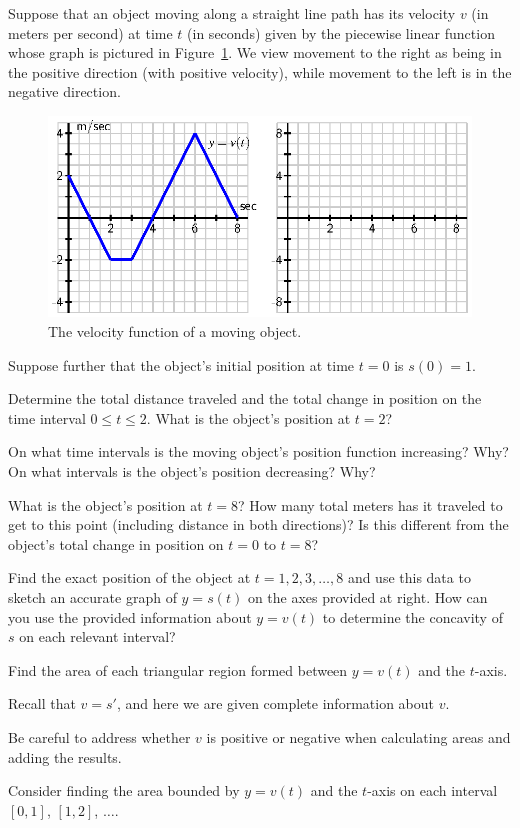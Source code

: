 \begin{activity} \label{A:4.1.3}  Suppose that an object moving along a straight line path has its velocity $v$ (in meters per second) at time $t$ (in seconds) given by the piecewise linear function whose graph is pictured in Figure~\ref{F:4.1.Act3}.  We view movement to the right as being in the positive direction (with positive velocity), while movement to the left is in the negative direction.
\begin{figure}[h]
\begin{center}
\includegraphics{figures/4_1_Act3.eps}
\caption{The velocity function of a moving object.} \label{F:4.1.Act3}
\end{center}
\end{figure}
Suppose further that the object's initial position at time $t = 0$ is $s(0) = 1$.
\ba
	\item Determine the total distance traveled and the total change in position on the time interval $0 \le t \le 2$.  What is the object's position at $t = 2$?
	\item On what time intervals is the moving object's position function increasing?  Why?  On what intervals is the object's position decreasing?  Why?
	\item What is the object's position at $t = 8$?  How many total meters has it traveled to get to this point (including distance in both directions)?  Is this different from the object's total change in position on $t = 0$ to $t = 8$?
	\item Find the exact position of the object at $t = 1, 2, 3, \ldots, 8$ and use this data to sketch an accurate graph of $y = s(t)$ on the axes provided at right.  How can you use the provided information about $y = v(t)$ to determine the concavity of $s$ on each relevant interval?
\ea
\end{activity}
\begin{smallhint}
\ba
	\item Find the area of each triangular region formed between $y = v(t)$ and the $t$-axis.
	\item Recall that $v = s'$, and here we are given complete information about $v$.
	\item Be careful to address whether $v$ is positive or negative when calculating areas and adding the results.
	\item Consider finding the area bounded by $y = v(t)$ and the $t$-axis on each interval $[0,1]$, $[1,2]$, $\ldots$.
\ea
\end{smallhint}

